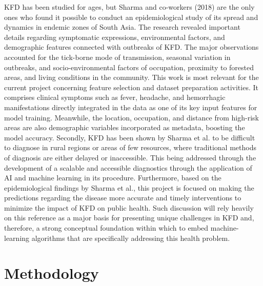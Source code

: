 \documentclass[conference]{IEEEtran}
\begin{document}
KFD has been studied for ages, but Sharma and co-workers (2018) are the only ones who found it possible to conduct an epidemiological study of its spread and dynamics in endemic zones of South Asia. The research revealed important details regarding symptomatic expressions, environmental factors, and demographic features connected with outbreaks of KFD. The major observations accounted for the tick-borne mode of transmission, seasonal variation in outbreaks, and socio-environmental factors of occupation, proximity to forested areas, and living conditions in the community. This work is most relevant for the current project concerning feature selection and dataset preparation activities. It comprises clinical symptoms such as fever, headache, and hemorrhagic manifestations directly integrated in the data as one of its key input features for model training. Meanwhile, the location, occupation, and distance from high-risk areas are also demographic variables incorporated as metadata, boosting the model accuracy. Secondly, KFD has been shown by Sharma et al. to be difficult to diagnose in rural regions or areas of few resources, where traditional methods of diagnosis are either delayed or inaccessible. This being addressed through the development of a scalable and accessible diagnostics through the application of AI and machine learning in its procedure. Furthermore, based on the epidemiological findings by Sharma et al., this project is focused on making the predictions regarding the disease more accurate and timely interventions to minimize the impact of KFD on public health. Such discussion will rely heavily on this reference as a major basis for presenting unique challenges in KFD and, therefore, a strong conceptual foundation within which to embed machine-learning algorithms that are specifically addressing this health problem.

\section{Methodology}
\end{document}
